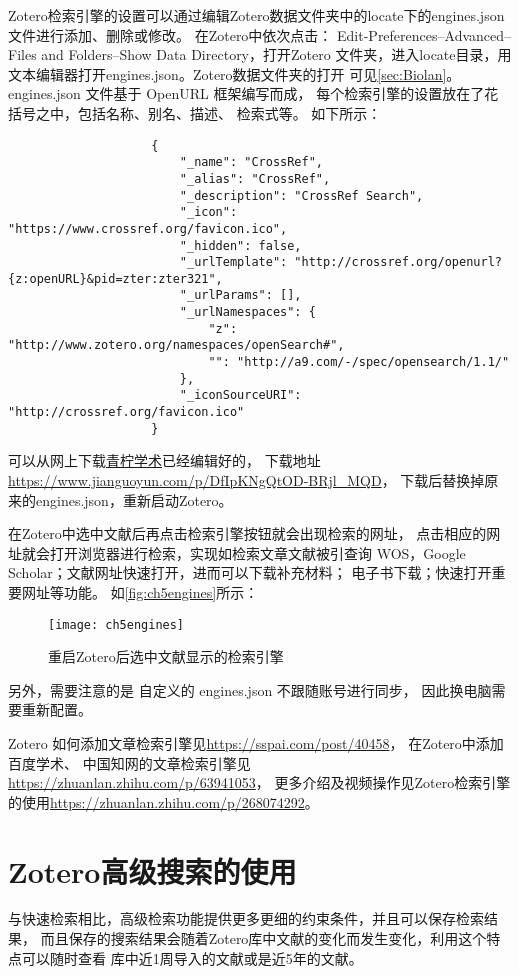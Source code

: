 \documentclass[cn,11pt,chinese]{elegantbook}
\begin{document}
			Zotero检索引擎的设置可以通过编辑Zotero数据文件夹中的locate下的engines.json
			文件进行添加、删除或修改。
			在Zotero中依次点击：
			Edit-Preferences–Advanced–Files and Folders–Show Data Directory，打开Zotero 
			文件夹，进入locate目录，用文本编辑器打开engines.json。Zotero数据文件夹的打开
			可见\cref{sec:Biolan}。engines.json 文件基于 OpenURL 框架编写而成，
			每个检索引擎的设置放在了花括号之中，包括名称、别名、描述、
			检索式等。
			如下所示：
				\begin{lstlisting}
					{
						"_name": "CrossRef",
						"_alias": "CrossRef",
						"_description": "CrossRef Search",
						"_icon": "https://www.crossref.org/favicon.ico",
						"_hidden": false,
						"_urlTemplate": "http://crossref.org/openurl?{z:openURL}&pid=zter:zter321",
						"_urlParams": [],
						"_urlNamespaces": {
							"z": "http://www.zotero.org/namespaces/openSearch#",
							"": "http://a9.com/-/spec/opensearch/1.1/"
						},
						"_iconSourceURI": "http://crossref.org/favicon.ico"
					}

				\end{lstlisting}
			
			
				可以从网上下载\href{https://www.zhihu.com/people/iseex/answers
			}{青柠学术}已经编辑好的，
			下载地址\url{https://www.jianguoyun.com/p/DfIpKNgQtOD-BRjl_MQD}，
			下载后替换掉原来的engines.json，重新启动Zotero。

			在Zotero中选中文献后再点击检索引擎按钮就会出现检索的网址，
			点击相应的网址就会打开浏览器进行检索，实现如检索文章文献被引查询
			WOS，Google Scholar；文献网址快速打开，进而可以下载补充材料；
			电子书下载；快速打开重要网址等功能。	
			如\autoref{fig:ch5engines}所示：
				\begin{figure}[ht]
					\centering
					\texttt{[image: ch5engines]}
					\caption{重启Zotero后选中文献显示的检索引擎}
					\label{fig:ch5engines}
				\end{figure}
			另外，需要注意的是
		自定义的 engines.json 不跟随账号进行同步，
		因此换电脑需要重新配置。

		Zotero 如何添加文章检索引擎见\url{https://sspai.com/post/40458}，
		在Zotero中添加百度学术、
		中国知网的文章检索引擎见\url{https://zhuanlan.zhihu.com/p/63941053}，
		更多介绍及视频操作见Zotero检索引擎的使用\url{https://zhuanlan.zhihu.com/p/268074292}。



		
		\section{Zotero高级搜索的使用}\label{sec:Advanced_search}
		与快速检索相比，高级检索功能提供更多更细的约束条件，并且可以保存检索结果，
		而且保存的搜索结果会随着Zotero库中文献的变化而发生变化，利用这个特点可以随时查看
		库中近1周导入的文献或是近5年的文献。
\end{document}
